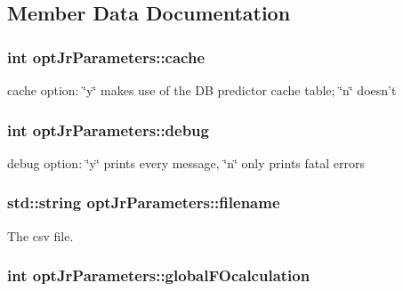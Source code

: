 \subsection{Member Data Documentation}
\hypertarget{classoptJrParameters_a62b46c4db0655e8aea32e2929996d626}{
\subsubsection[{cache}]{\setlength{\rightskip}{0pt plus 5cm}int opt\-Jr\-Parameters\-::cache\hspace{0.3cm}{\ttfamily [private]}}}\label{classoptJrParameters_a62b46c4db0655e8aea32e2929996d626}


cache option\-: \char`\"{}y\char`\"{} makes use of the D\-B predictor cache table; \char`\"{}n\char`\"{} doesn't 

\hypertarget{classoptJrParameters_aeac321db6ab6babd047c06696a260e90}{
\subsubsection[{debug}]{\setlength{\rightskip}{0pt plus 5cm}int opt\-Jr\-Parameters\-::debug\hspace{0.3cm}{\ttfamily [private]}}}\label{classoptJrParameters_aeac321db6ab6babd047c06696a260e90}


debug option\-: \char`\"{}y\char`\"{} prints every message, \char`\"{}n\char`\"{} only prints fatal errors 

\hypertarget{classoptJrParameters_a62fe03fe9f9484b54235a0dbe4c09736}{
\subsubsection[{filename}]{\setlength{\rightskip}{0pt plus 5cm}std\-::string opt\-Jr\-Parameters\-::filename\hspace{0.3cm}{\ttfamily [private]}}}\label{classoptJrParameters_a62fe03fe9f9484b54235a0dbe4c09736}


The csv file. 

\hypertarget{classoptJrParameters_ad00a4d00bc8b65f4323a1bd1383c632b}{
\subsubsection[{global\-F\-Ocalculation}]{\setlength{\rightskip}{0pt plus 5cm}int opt\-Jr\-Parameters\-::global\-F\-Ocalculation\hspace{0.3cm}{\ttfamily [private]}}}\label{classoptJrParameters_ad00a4d00bc8b65f4323a1bd1383c632b}


